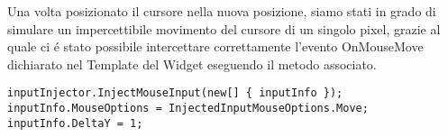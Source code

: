 Una volta posizionato il cursore nella nuova posizione, siamo stati in grado di simulare un impercettibile movimento del cursore di un singolo pixel, grazie al quale ci é stato possibile intercettare correttamente l’evento OnMouseMove dichiarato nel Template del Widget eseguendo il metodo associato.

\vspace{1.0cm}
\begin{lstlisting}[caption={Spostamento cursore},style=javaScriptCode]
inputInjector.InjectMouseInput(new[] { inputInfo });
inputInfo.MouseOptions = InjectedInputMouseOptions.Move;
inputInfo.DeltaY = 1;
\end{lstlisting} 
\vspace{1.0cm}
